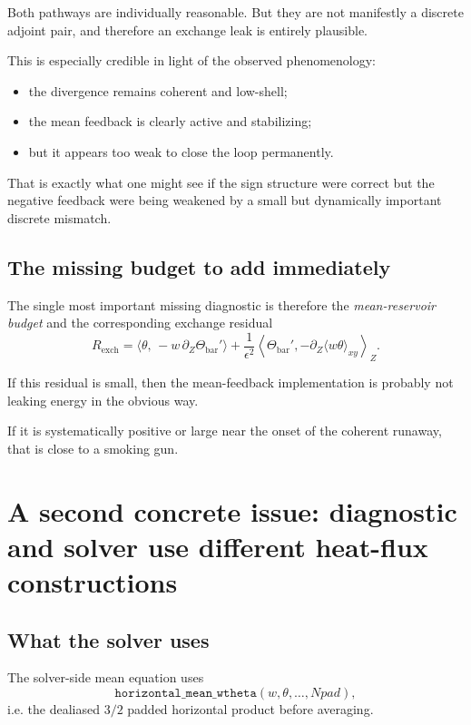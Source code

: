 \documentclass[11pt]{article}
\begin{document}
Both pathways are individually reasonable. But they are not manifestly a discrete adjoint pair, and therefore an exchange leak is entirely plausible.

This is especially credible in light of the observed phenomenology:

\begin{itemize}
\item the divergence remains coherent and low-shell;
\item the mean feedback is clearly active and stabilizing;
\item but it appears too weak to close the loop permanently.
\end{itemize}

That is exactly what one might see if the sign structure were correct but the negative feedback were being weakened by a small but dynamically important discrete mismatch.

\subsection{The missing budget to add immediately}

The single most important missing diagnostic is therefore the \emph{mean-reservoir budget} and the corresponding exchange residual
\[
R_{\mathrm{exch}}
=
\langle \theta,\,-w\,\partial_Z\Theta_{\mathrm{bar}}' \rangle
+
\frac{1}{\epsilon^2}
\left\langle
\Theta_{\mathrm{bar}}',
-\partial_Z\langle w\theta\rangle_{xy}
\right\rangle_Z.
\]

If this residual is small, then the mean-feedback implementation is probably not leaking energy in the obvious way.

If it is systematically positive or large near the onset of the coherent runaway, that is close to a smoking gun.

\section{A second concrete issue: diagnostic and solver use different heat-flux constructions}

\subsection{What the solver uses}

The solver-side mean equation uses
\[
\texttt{horizontal\_mean\_wtheta}(w,\theta,\ldots,Npad),
\]
i.e. the dealiased $3/2$ padded horizontal product before averaging.
\end{document}
